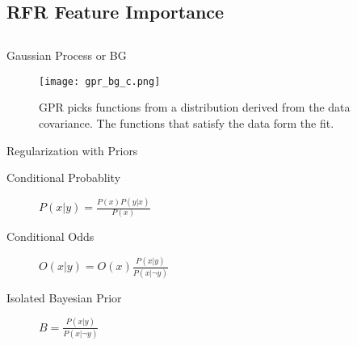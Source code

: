 \documentclass[10pt, compress]{beamer}
\begin{document}
\subsection{RFR Feature Importance}
\label{sec:org6403c1f}
\subsection{}
\label{sec:org859dc4a}
\begin{frame}[allowframebreaks]{Gaussian Process or BG}
\begin{figure}[htbp]
\centering
\texttt{[image: gpr\_bg\_c.png]}
\caption{GPR picks functions from a distribution derived from the data covariance. The functions that satisfy the data form the fit.}
\end{figure}
\begin{block}{Regularization with Priors}
\begin{description}
\item[{Conditional Probablity}] \(P(x|y) = \frac{P(x)P(y|x)}{P(x)}\)
\item[{Conditional Odds}] \(O(x|y) = O(x)\frac{P(x|y)}{P(x|\neg{}y)}\)
\item[{Isolated Bayesian Prior}] \(B = \frac{P(x|y)}{P(x|\neg{}y)}\)
\end{description}
\end{block}
\end{frame}

\section{}
\label{sec:org2564950}
\printbibliography
\end{document}
